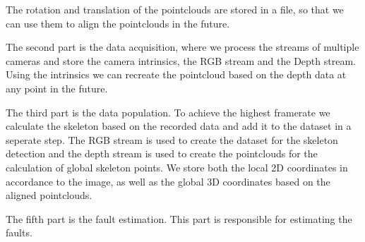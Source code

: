 The rotation and translation of the pointclouds are stored in a file, so that we can use them to align the pointclouds in the future.

The second part is the data acquisition, where we process the streams of multiple cameras and store the camera intrinsics, the RGB stream and the Depth stream. Using the intrinsics we can recreate the pointcloud based on the depth data at any point in the future.

The third part is the data population. To achieve the highest framerate we calculate the skeleton based on the recorded data and add it to the dataset in a seperate step. The RGB stream is used to create the dataset for the skeleton detection and the depth stream is used to create the pointclouds for the calculation of global skeleton points. We store both the local 2D coordinates in accordance to the image, as well as the global 3D coordinates based on the aligned pointclouds. 

The fifth part is the fault estimation. This part is responsible for estimating the faults.